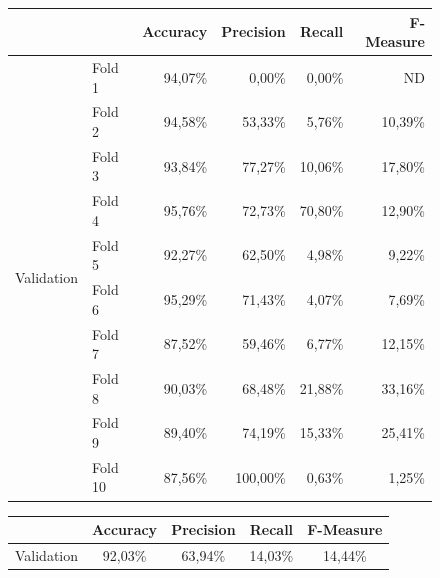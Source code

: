 \begin{figure}[H]
	\centering
	\begin{tabular}{llrrrr}
		\toprule
		&& \textbf{Accuracy} & \textbf{Precision} & \textbf{Recall} & 
		\textbf{F-Measure}  \\
		\midrule
		\multirow{10}{*}{Validation} 
				& Fold 1  & 94,07\% &   0,00\% &  0,00\% &    ND   \\
				& Fold 2  & 94,58\% &  53,33\% &  5,76\% & 10,39\% \\
				& Fold 3  & 93,84\% &  77,27\% & 10,06\% & 17,80\% \\
				& Fold 4  & 95,76\% &  72,73\% & 70,80\% & 12,90\% \\
				& Fold 5  & 92,27\% &  62,50\% &  4,98\% &  9,22\% \\
				& Fold 6  & 95,29\% &  71,43\% &  4,07\% &  7,69\% \\
				& Fold 7  & 87,52\% &  59,46\% &  6,77\% & 12,15\% \\
				& Fold 8  & 90,03\% &  68,48\% & 21,88\% & 33,16\% \\
				& Fold 9  & 89,40\% &  74,19\% & 15,33\% & 25,41\% \\
				& Fold 10 & 87,56\% & 100,00\% &  0,63\% &  1,25\% \\
		\bottomrule 
	\end{tabular}
	\label{tab:mlp_cv_fold_performance}
\end{figure}

\begin{figure}[H]
	\centering
	\begin{tabular}{lcccc}
		\toprule
		& \textbf{Accuracy} & \textbf{Precision} & \textbf{Recall} & 
		\textbf{F-Measure}  \\
		\midrule
		Validation	&  92,03\%	& 63,94\%	& 14,03\% &	14,44\% \\
		\bottomrule
	\end{tabular}
	\label{tab:mlp_cv_performance}
\end{figure}

